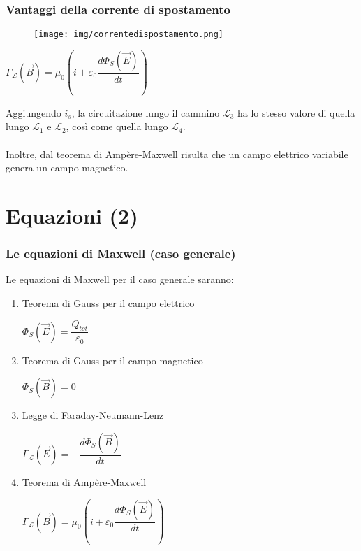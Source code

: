 \documentclass[]{beamer}
\theoremstyle{plain}
\begin{document}
\begin{frame}
\frametitle{Vantaggi della corrente di spostamento}
\begin{figure}
\texttt{[image: img/correntedispostamento.png]}
\end{figure}
\begin{center}
$ \Gamma_\mathscr{L} (\vec{B}) = \mu_0 \left( i + \varepsilon_0 \dfrac{d\Phi_S(\vec{E})}{dt} \right) $
\end{center}
Aggiungendo $ i_s $, la circuitazione lungo il cammino $ \mathscr{L}_3 $ ha lo stesso valore di quella lungo $ \mathscr{L}_1 $ e $ \mathscr{L}_2 $, così come quella lungo $ \mathscr{L}_4 $.\\\pause~\\Inoltre, dal teorema di Ampère-Maxwell risulta che \alert{un campo elettrico variabile genera un campo magnetico}.
\end{frame}











\section{Equazioni (2)}

\begin{frame}
\frametitle{Le equazioni di Maxwell (caso generale)}
  Le \alert{equazioni di Maxwell} per il caso generale saranno:\begin{enumerate}
  \item Teorema di Gauss per il campo elettrico
  \begin{center}
  \colorbox{blue!30}{$ \Phi_S (\vec{E}) = \dfrac{Q_{tot}}{\varepsilon_0} $}
  \end{center}\pause
  \item Teorema di Gauss per il campo magnetico
  \begin{center}
  \colorbox{blue!30}{$ \Phi_S (\vec{B}) = 0 $}
  \end{center}\pause
  \item Legge di Faraday-Neumann-Lenz
  \begin{center}
\colorbox{blue!30}{  $ \Gamma_\mathscr{L} (\vec{E}) = -\dfrac{d\Phi_S(\vec{B})}{dt} $}
  \end{center}\pause
  \item Teorema di Ampère-Maxwell
  \begin{center}
  \colorbox{blue!30}{$ \Gamma_\mathscr{L} (\vec{B}) = \mu_0 \left( i + \varepsilon_0 \dfrac{d\Phi_S(\vec{E})}{dt} \right) $}
  \end{center}
\end{enumerate}
\end{frame}
\end{document}
